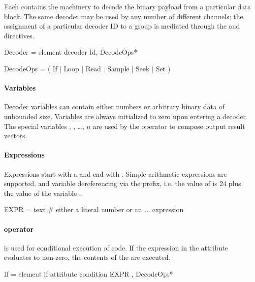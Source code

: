\documentclass{article}
\begin{document}
Each  contains the machinery to decode the binary payload
from a particular data block. The same decoder may be used by any
number of different channels; the assignment of a particular decoder
ID to a group is mediated through the  and 
directives. 

\begin{grammar}
Decoder = element decoder {
  Id,
  DecodeOps*
}
\end{grammar}
\begin{grammar}
DecodeOps = ( If | Loop | Read | Sample | Seek | Set )
\end{grammar}

\paragraph{Variables}

Decoder variables can contain either numbers or arbitrary binary data
of unbounded size.  Variables are always initialized to zero upon
entering a decoder.  The special variables , , \ldots,
$n$ are used by the  operator to compose output
result vectors.

\paragraph{Expressions}

Expressions start with a \xml{\{} and end with \xml{\}}.  Simple
arithmetic expressions are supported, and variable dereferencing via
the \xml{\$} prefix, i.e. the value of  is 24 plus
the value of the variable .

\begin{grammar}
EXPR = text  # either a literal number or an {...} expression
\end{grammar}

\paragraph{ operator}

 is used for conditional execution of code.  If the expression
in the  attribute evaluates to non-zero, the contents
of the  are executed.

\begin{grammar}
If = element if {
  attribute condition { EXPR },
  DecodeOps*
}
\end{grammar}
\end{document}

